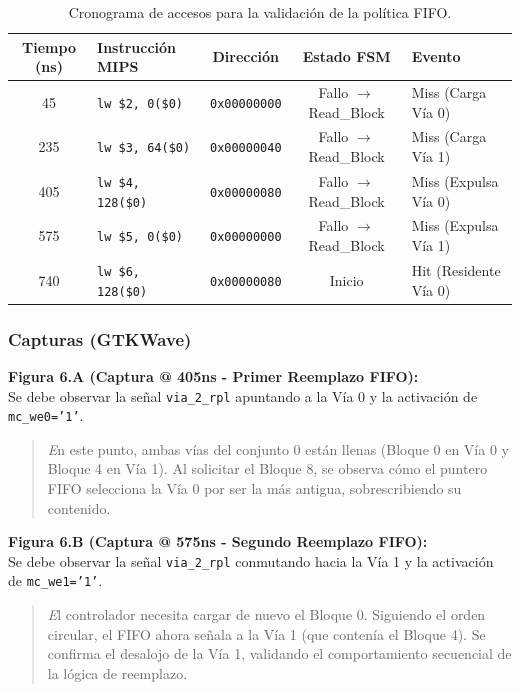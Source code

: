 \documentclass[12pt,a4paper]{article}
\begin{document}
\begin{table}[H]
\centering
\small
\renewcommand{\arraystretch}{1.2}
\begin{tabular}{|c|l|c|c|l|}
\hline
\rowcolor[HTML]{EFEFEF} 
\textbf{Tiempo (ns)} & \textbf{Instrucción MIPS} & \textbf{Dirección} & \textbf{Estado FSM} & \textbf{Evento} \\ \hline
45  & \texttt{lw \$2, 0(\$0)}    & \texttt{0x00000000} & Fallo $\rightarrow$ Read\_Block & Miss (Carga Vía 0) \\ \hline
235 & \texttt{lw \$3, 64(\$0)}   & \texttt{0x00000040} & Fallo $\rightarrow$ Read\_Block & Miss (Carga Vía 1) \\ \hline
405 & \texttt{lw \$4, 128(\$0)}  & \texttt{0x00000080} & Fallo $\rightarrow$ Read\_Block & Miss (Expulsa Vía 0) \\ \hline
575 & \texttt{lw \$5, 0(\$0)}    & \texttt{0x00000000} & Fallo $\rightarrow$ Read\_Block & Miss (Expulsa Vía 1) \\ \hline
740 & \texttt{lw \$6, 128(\$0)}  & \texttt{0x00000080} & Inicio                 & Hit (Residente Vía 0) \\ \hline
\end{tabular}
\caption{Cronograma de accesos para la validación de la política FIFO.}
\end{table}

\subsubsection{Capturas (GTKWave)}

\textbf{Figura 6.A (Captura @ 405ns - Primer Reemplazo FIFO):} \\
Se debe observar la señal \texttt{via\_2\_rpl} apuntando a la Vía 0 y la activación de \texttt{mc\_we0='1'}.
\begin{quote}
    \textit En este punto, ambas vías del conjunto 0 están llenas (Bloque 0 en Vía 0 y Bloque 4 en Vía 1). Al solicitar el Bloque 8, se observa cómo el puntero FIFO selecciona la Vía 0 por ser la más antigua, sobrescribiendo su contenido.
\end{quote}

\textbf{Figura 6.B (Captura @ 575ns - Segundo Reemplazo FIFO):} \\
Se debe observar la señal \texttt{via\_2\_rpl} conmutando hacia la Vía 1 y la activación de \texttt{mc\_we1='1'}.
\begin{quote}
    \textit El controlador necesita cargar de nuevo el Bloque 0. Siguiendo el orden circular, el FIFO ahora señala a la Vía 1 (que contenía el Bloque 4). Se confirma el desalojo de la Vía 1, validando el comportamiento secuencial de la lógica de reemplazo.
\end{quote}
\end{document}
